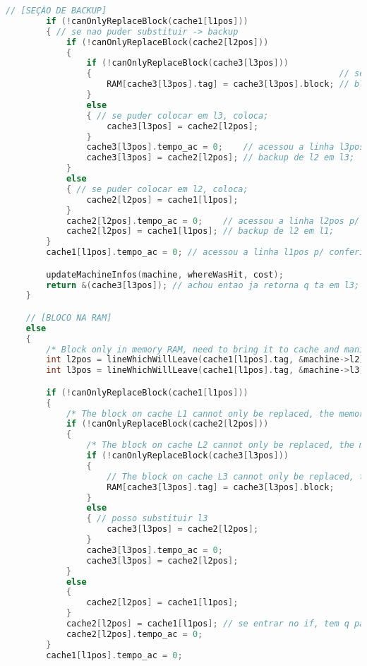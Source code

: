 \documentclass{article}
\begin{document}
\begin{lstlisting}[caption={Exemplo da função MMUSearchOnMemorys.},label={lst:cod1},language=C]
        // [SEÇÃO DE BACKUP]
        if (!canOnlyReplaceBlock(cache1[l1pos]))
        { // se nao puder substituir -> backup
            if (!canOnlyReplaceBlock(cache2[l2pos]))
            {
                if (!canOnlyReplaceBlock(cache3[l3pos]))
                {                                                 // se nao puder colocar em l3, joga p/ ram;
                    RAM[cache3[l3pos].tag] = cache3[l3pos].block; // bloco diferente de linha, substituo so o bloco aq entao;
                }
                else
                { // se puder colocar em l3, coloca;
                    cache3[l3pos] = cache2[l2pos];
                }
                cache3[l3pos].tempo_ac = 0;    // acessou a linha l3pos p/ conferir se pode substituir;
                cache3[l3pos] = cache2[l2pos]; // backup de l2 em l3;
            }
            else
            { // se puder colocar em l2, coloca;
                cache2[l2pos] = cache1[l1pos];
            }
            cache2[l2pos].tempo_ac = 0;    // acessou a linha l2pos p/ conferir se pode substituir;
            cache2[l2pos] = cache1[l1pos]; // backup de l2 em l1;
        }
        cache1[l1pos].tempo_ac = 0; // acessou a linha l1pos p/ conferir se pode substituir, logo time = 0;

        updateMachineInfos(machine, whereWasHit, cost);
        return &(cache3[l3pos]); // achou entao ja retorna q ta em l3;
    }

    // [BLOCO NA RAM]
    else
    {
        /* Block only in memory RAM, need to bring it to cache and manipulate the blocks */
        int l2pos = lineWhichWillLeave(cache1[l1pos].tag, &machine->l2); /* Need to check the position of the block that will leave the L1 */
        int l3pos = lineWhichWillLeave(cache1[l1pos].tag, &machine->l3);

        if (!canOnlyReplaceBlock(cache1[l1pos]))
        {
            /* The block on cache L1 cannot only be replaced, the memories must be updated */
            if (!canOnlyReplaceBlock(cache2[l2pos]))
            {
                /* The block on cache L2 cannot only be replaced, the memories must be updated */
                if (!canOnlyReplaceBlock(cache3[l3pos]))
                {
                    // The block on cache L3 cannot only be replaced, the memories must be updated //
                    RAM[cache3[l3pos].tag] = cache3[l3pos].block;
                }
                else
                { // posso substituir l3
                    cache3[l3pos] = cache2[l2pos];
                }
                cache3[l3pos].tempo_ac = 0;
                cache3[l3pos] = cache2[l2pos];
            }
            else
            {
                cache2[l2pos] = cache1[l1pos];
            }
            cache2[l2pos] = cache1[l1pos]; // se entrar no if, tem q passar por esse estagio aqui ;
            cache2[l2pos].tempo_ac = 0;
        }
        cache1[l1pos].tempo_ac = 0;


\end{lstlisting}
\end{document}

